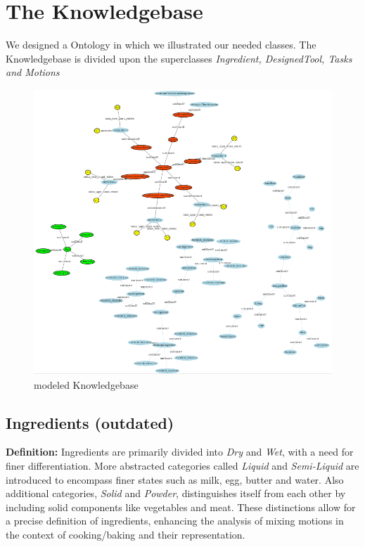 \section{The Knowledgebase}
We designed a Ontology in which we illustrated our needed classes. 
The Knowledgebase is divided upon the superclasses \textit{Ingredient, DesignedTool, Tasks and Motions }
\begin{figure}[H]
\includegraphics[scale=0.5]{Graphics/mixing_graph_repr.png}
\caption{modeled Knowledgebase}
\end{figure}

\subsection{Ingredients (outdated)}

\textbf{Definition:}
Ingredients are primarily divided into \textit{Dry} and \textit{Wet}, with a need for finer differentiation. More abstracted categories called \textit{Liquid} and \textit{Semi-Liquid} are introduced to encompass finer states such as milk, egg, butter and water. Also additional categories, \textit{Solid} and \textit{Powder}, distinguishes itself from each other by including solid components like vegetables and meat. These distinctions allow for a precise definition of ingredients, enhancing the analysis of mixing motions in the context of cooking/baking and their representation.

